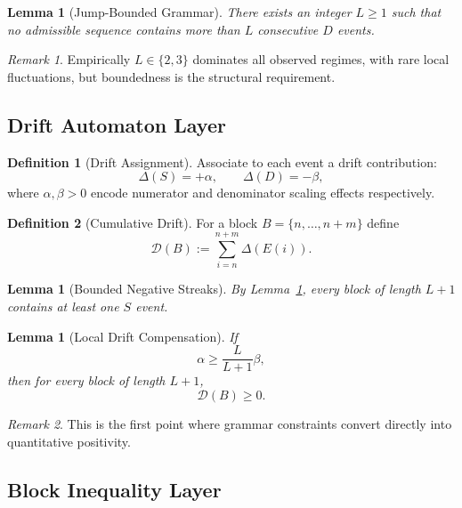 \documentclass[12pt, oneside]{article}
\numberwithin{equation}{section}
\theoremstyle{definition}
\newtheorem{definition}{Definition}[section]
\theoremstyle{plain}
\newtheorem{lemma}[theorem]{Lemma}
\theoremstyle{remark}
\newtheorem*{remark}{Remark}
\begin{document}
\begin{lemma}[Jump-Bounded Grammar]
\label{lem:grammar-bound}
There exists an integer $L \ge 1$ such that no admissible sequence
contains more than $L$ consecutive $D$ events.
\end{lemma}

\begin{remark}
Empirically $L \in \{2,3\}$ dominates all observed regimes, with rare
local fluctuations, but boundedness is the structural requirement.
\end{remark}

\subsection{Drift Automaton Layer}

\begin{definition}[Drift Assignment]
Associate to each event a drift contribution:
\[
\Delta(S) = +\alpha,\qquad \Delta(D) = -\beta,
\]
where $\alpha,\beta > 0$ encode numerator and denominator scaling
effects respectively.
\end{definition}

\begin{definition}[Cumulative Drift]
For a block $B = \{n,\dots,n+m\}$ define
\[
\mathcal{D}(B) := \sum_{i=n}^{n+m} \Delta(E(i)).
\]
\end{definition}

\begin{lemma}[Bounded Negative Streaks]
\label{lem:bounded-streaks}
By Lemma~\ref{lem:grammar-bound}, every block of length $L+1$
contains at least one $S$ event.
\end{lemma}

\begin{lemma}[Local Drift Compensation]
\label{lem:local-comp}
If
\[
\alpha \ge \frac{L}{L+1}\beta,
\]
then for every block of length $L+1$,
\[
\mathcal{D}(B) \ge 0.
\]
\end{lemma}

\begin{remark}
This is the first point where grammar constraints convert directly
into quantitative positivity.
\end{remark}

\subsection{Block Inequality Layer}
\end{document}
